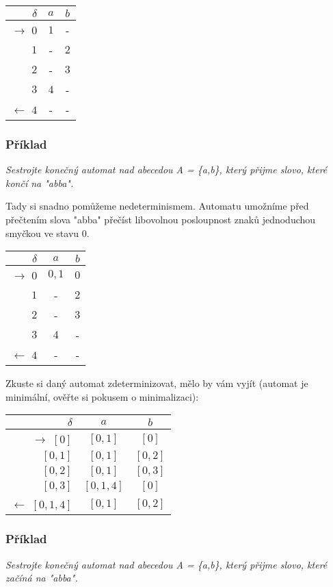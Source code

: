 \documentclass{article}
\begin{document}
\begin{tabular}{|r||c|c|}
\hline
 $\delta$ &      $a$ &   $b$\\
\hline
\hline
$\rightarrow$ $0$ &     $1$ &   -\\
$1$ &   - &     $2$\\
$2$ &   - &     $3$\\
$3$ &   $4$ &   -\\
$\leftarrow$ $4$ &      - &     -\\
\hline
\end{tabular}

\subsubsection{Příklad}
\emph{
Sestrojte konečný automat nad abecedou A = \{a,b\}, který přijme slovo, které končí na "abba".
}

Tady si snadno pomůžeme nedeterminismem. Automatu umožníme před přečtením slova "abba" přečíst libovolnou posloupnost znaků jednoduchou smyčkou ve stavu 0.

\begin{tabular}{|r||c|c|}
\hline
 $\delta$ &      $a$ &   $b$\\
\hline
\hline
$\rightarrow$ $0$ &     $0,1$ & $0$\\
$1$ &   - &     $2$\\
$2$ &   - &     $3$\\
$3$ &   $4$ &   -\\
$\leftarrow$ $4$ &      - &     -\\
\hline
\end{tabular}


Zkuste si daný automat zdeterminizovat, mělo by vám vyjít (automat je minimální, ověřte si pokusem o minimalizaci):

\begin{tabular}{|r||c|c|}
\hline
 $\delta$ &      $a$ &   $b$\\
\hline
\hline
$\rightarrow$ $[0]$ &   $[0,1]$ &       $[0]$\\
$[0,1]$ &       $[0,1]$ &       $[0,2]$\\
$[0,2]$ &       $[0,1]$ &       $[0,3]$\\
$[0,3]$ &       $[0,1,4]$ &     $[0]$\\
$\leftarrow$ $[0,1,4]$ &        $[0,1]$ &       $[0,2]$\\
\hline
\end{tabular}

\subsubsection{Příklad}
\emph{
Sestrojte konečný automat nad abecedou A = \{a,b\}, který přijme slovo, které začíná na "abba".
}
\end{document}
